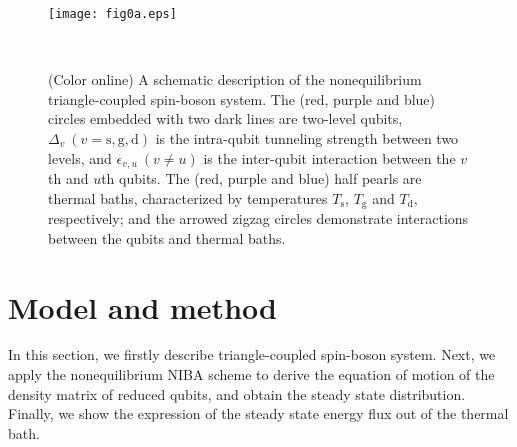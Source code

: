 \documentclass[twocolumn,preprintnumbers,amsmath,amssymb]{revtex4}
\begin{document}
\begin{figure}[tbp]
\texttt{[image: fig0a.eps]}
\caption{(Color online) A schematic description of the nonequilibrium triangle-coupled spin-boson system.
The (red, purple and blue) circles embedded with two dark lines are two-level qubits, $\Delta_v~(v=\textrm{s},\textrm{g},\textrm{d})$
is the intra-qubit tunneling strength between two levels, and $\epsilon_{v,u}~(v{\neq}u)$ is the inter-qubit  interaction
between the $v$th and $u$th qubits.
The (red, purple and blue) half pearls are thermal baths, characterized by temperatures $T_{\textrm{s}}$, $T_{\textrm{g}}$ and $T_{\textrm{d}}$, respectively;
and the arrowed zigzag circles demonstrate interactions between the qubits and thermal baths.
}~\label{fig0a}
\end{figure}

\section{Model and method}
In this section, we firstly describe triangle-coupled spin-boson system.
Next, we apply the nonequilibrium NIBA scheme to derive the equation of motion of the density matrix of reduced qubits,
and obtain the steady state distribution.
Finally, we show the expression of the steady state energy flux out of the thermal bath.
\end{document}
